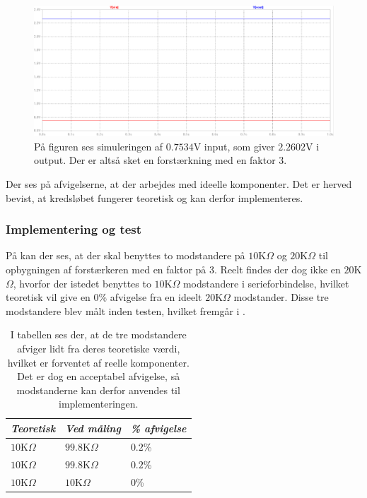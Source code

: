 \begin{figure}[H]
	\centering
	\includegraphics[scale=0.4]{figures/cProblemloesning/Forstaerker_faktor3_simulering.PNG}
	\caption{På figuren ses simuleringen af $0.7534$V input, som giver $2.2602$V i output. Der er altså sket en forstærkning med en faktor $3$.}
	\label{fig:faktor3_simulering}
\end{figure}
\noindent Der ses på afvigelserne, at der arbejdes med ideelle komponenter. Det er herved bevist, at kredsløbet fungerer teoretisk og kan derfor implementeres.

\subsubsection{Implementering og test}
På  kan der ses, at der skal benyttes to modstandere på $10$K$\Omega$ og $20$K$\Omega$ til opbygningen af forstærkeren med en faktor på 3. Reelt findes der dog ikke en $20$K$\Omega$, hvorfor der istedet benyttes to $10$K$\Omega$ modstandere i serieforbindelse, hvilket teoretisk vil give en $0$\% afvigelse fra en ideelt $20$K$\Omega$ modstander. Disse tre modstandere blev målt inden testen, hvilket fremgår i .
\begin{table}[H]
	\centering
	\begin{tabular}{|l|l|l|}
		\hline
		\textit{Teoretisk}  & \textit{Ved måling} & \textit{\% afvigelse} \\ \hline
		$10$K$\Omega$       & $99.8$K$\Omega$     & $0.2$\%               \\ \hline
		$10$K$\Omega$       & $99.8$K$\Omega$     & $0.2$\%               \\ \hline
		$10$K$\Omega$       & $10$K$\Omega$       & $0$\%               \\ \hline
	\end{tabular}
	\caption{I tabellen ses der, at de tre modstandere afviger lidt fra deres teoretiske værdi, hvilket er forventet af reelle komponenter. Det er dog en acceptabel afvigelse, så modstanderne kan derfor anvendes til implementeringen.}
	\label{Tab:modstand_faktor18}
\end{table}

